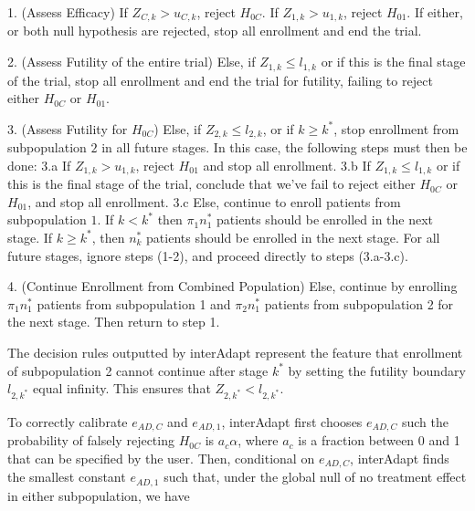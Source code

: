 \documentclass{article}
\newcommand{\interAdapt}{\textsf{interAdapt }}
\begin{document}
\begin{description}
\item 1. (Assess Efficacy) If $Z_{C,k} > u_{C,k}$, reject $H_{0C}$. If $Z_{1,k}>u_{1,k}$, reject $H_{01}$. If either, or both null hypothesis are rejected, stop all enrollment and end the trial.
\item 2. (Assess Futility of the entire trial) Else, if $Z_{1,k} ≤ l_{1,k}$ or if this is the final stage of the trial, stop all enrollment and end the trial for futility, failing to reject either $H_{0C}$ or $H_{01}$.
\item 3. (Assess Futility for $H_{0C}$) Else, if $Z_{2,k} ≤ l_{2,k}$, or if $k\geq k^*$, stop enrollment from subpopulation $2$ in all future stages. In this case, the following steps must then be done:
	\subitem  3.a If $Z_{1,k} > u_{1,k}$, reject $H_{01}$ and stop all enrollment.
	\subitem  3.b If $Z_{1,k} ≤ l_{1,k}$ or if this is the final stage of the trial, conclude that we've fail to reject either $H_{0C}$ or $H_{01}$, and stop all enrollment.
	\subitem  3.c Else, continue to enroll patients from subpopulation $1$. If $k<k^*$ then $π_1n_1^*$ patients should be enrolled in the next stage. If $k≥k^*$, then $n_k^*$ patients should be enrolled in the next stage. For all future stages, ignore steps (1-2), and proceed directly to steps (3.a-3.c).
\item  4. (Continue Enrollment from Combined Population) Else, continue by enrolling $\pi_1 n_1^*$ patients from subpopulation 1 and $\pi_2 n_1^*$ patients from subpopulation 2 for the next stage. Then return to step 1.
\end{description}

The decision rules outputted by \interAdapt represent the feature that enrollment of subpopulation 2 cannot continue after stage $k^*$ by setting the futility boundary $l_{2,k^*}$ equal infinity. This ensures that $Z_{2,k^*}<l_{2,k^*}$. 

To correctly calibrate $e_{AD,C}$  and $e_{AD,1}$, \interAdapt first chooses $e_{AD,C}$ such the probability of falsely rejecting $H_{0C}$ is $a_c α$, where $a_c$ is a fraction between 0 and 1 that can be specified by the user. Then, conditional on $e_{AD,C}$, \interAdapt finds the smallest constant $e_{AD,1}$ such that, under the global null of no treatment effect in either subpopulation, we have %
\end{document}

